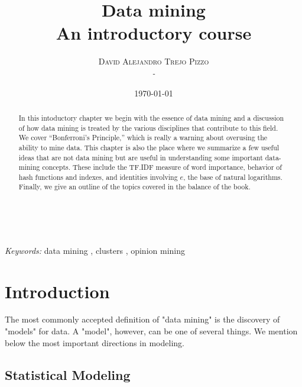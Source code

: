 \documentclass[a4paper, 11pt]{article} %
\title{\textbf{Data mining}\\ %
An introductory course} %
\author{\textsc{David Alejandro Trejo Pizzo} %
\\{\textit{-}}} %
\date{\today} %
\makeatletter
\renewcommand{\maketitle}{ %
\begin{flushright} %
{\LARGE\@title} %

\vspace{50pt} %

{\large\@author} %
\\\@date %

\vspace{40pt} %
\end{flushright}
}
\makeatother
\begin{document}
\maketitle %



\begin{abstract}
In this intoductory chapter we begin with the essence of data mining and a discussion of how data mining is treated by the various disciplines that contribute to this field. We cover “Bonferroni’s Principle,” which is really a warning about overusing the ability to mine data. This chapter is also the place where we summarize a few useful ideas that are not data mining but are useful in understanding some important data-mining concepts. These include the TF.IDF measure of word importance, behavior of hash functions and indexes, and identities involving $e$, the base of natural logarithms. Finally, we give an outline of the topics covered in the balance of the book.
\end{abstract}

\hspace*{3,6mm}\textit{Keywords:} data mining , clusters , opinion mining%

\vspace{30pt} %


\section{Introduction}

The most commonly accepted definition of "data mining" is the discovery of
"models" for data. A "model", however, can be one of several things. We
mention below the most important directions in modeling.

\subsection{Statistical Modeling}
\end{document}
